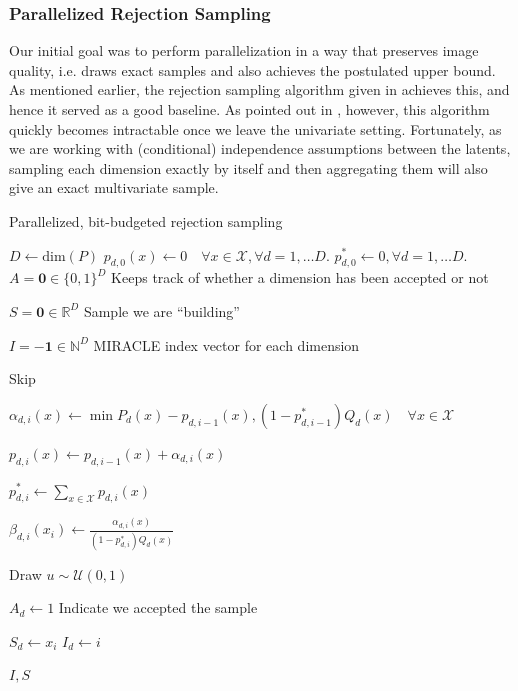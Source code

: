 \documentclass{article}
\renewcommand{\vec}[1]{\mathbf{#1}}
\newcommand{\X}{\mathcal{X}}
\newcommand{\Reals}{\mathbb{R}}
\newcommand{\Nats}{\mathbb{N}}
\newcommand{\Unif}[1]{\mathcal{U}\left( #1 \right)}
\begin{document}
\subsubsection{Parallelized Rejection Sampling}
\par
Our initial goal was to perform parallelization in a way that preserves image
quality, i.e. draws exact samples and also achieves the postulated upper bound.
As mentioned earlier, the rejection sampling algorithm given in
\cite{harsha2007communication} achieves this, and hence it served as a good
baseline. As pointed out in \cite{havasi2018minimal}, however, this algorithm
quickly becomes intractable once we leave the univariate setting. Fortunately, as we
are working with (conditional) independence assumptions between the latents,
sampling each dimension exactly by itself and then aggregating them will also
give an exact multivariate sample.
\begin{algorithm}
  \caption{Parallelized, bit-budgeted rejection sampling}
  \label{alg:multivariate_rej_samp}
  \begin{algorithmic}
    \Procedure{Rej-Sampler}{$B, P, Q, \langle x_i \sim Q \mid i \in \Nats \rangle$}
    \State $D \gets \text{dim}(P)$
    \State $p_{d, 0}(x) \gets 0 \quad \forall x \in \X, \forall d = 1,\hdots D$.
    \State $p_{d, 0}^* \gets 0, \forall d = 1,\hdots D$.
    \State $A = \vec{0} \in \{0, 1\}^D$
    \Comment Keeps track of whether a dimension has been accepted or not

    \State $S = \vec{0} \in \Reals^D$
    \Comment Sample we are ``building''

    \State $I = -\vec{1} \in \Nats^D$
    \Comment MIRACLE index vector for each dimension




    \State Skip

    \EndIf


    \State
    $\alpha_{d, i}(x) \gets \min{P_d(x) - p_{d, i - 1}(x), (1 - p_{d, i - 1}^*)Q_d(x)}\quad
    \forall x \in \X$

    \State $p_{d, i}(x) \gets p_{d, i - 1}(x) + \alpha_{d, i}(x)$
    
    \State $p_{d, i}^* \gets \sum_{x \in \X}p_{d, i}(x)$

    \State $\beta_{d, i}(x_i) \gets \frac{\alpha_{d, i}(x)}{(1 - p_{d, i}^*)Q_d(x)}$

    \State Draw $u \sim \Unif{0, 1}$


    \State $A_d \gets 1$
    \Comment Indicate we accepted the sample

    \State $S_d \gets x_i$
    \State $I_d \gets i$

    \EndIf
    
    \EndFor
    \EndFor

    \State\Return $I, S$
    \EndProcedure
  \end{algorithmic}
\end{algorithm}
\end{document}
